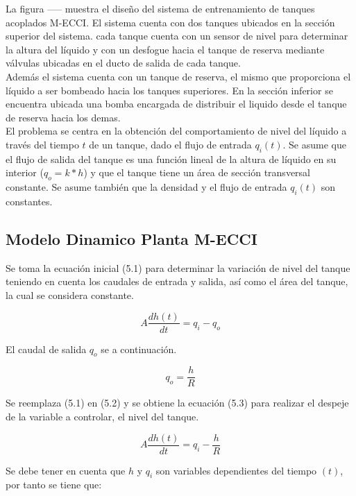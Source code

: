 \documentclass[a4paper,12pt,twoside]{proyectotanquesecci}
\begin{document}
La figura ----- muestra el diseño del sistema de entrenamiento de tanques acoplados M-ECCI. El sistema cuenta con dos tanques ubicados en la sección superior del sistema. cada tanque cuenta con un sensor de nivel para determinar la altura del líquido y con un desfogue hacia el tanque de reserva mediante válvulas
ubicadas en el ducto de salida de cada tanque. \\

Además el sistema cuenta con un tanque de reserva, el mismo que proporciona el líquido a ser bombeado hacia los tanques superiores. En la sección inferior se encuentra ubicada una bomba encargada de distribuir el liquido desde el tanque de reserva hacia los demas. \\

El problema se centra en la obtención del comportamiento de nivel del líquido a través del tiempo $t$ de un tanque, dado el flujo de entrada $q_{i}(t)$. Se asume que el flujo de salida del tanque es una función lineal de la altura de líquido en su interior ($q_{o}=k*h$) y que el tanque tiene un área de sección transversal constante. Se asume también que la densidad y el flujo de entrada $q_{i}(t)$ son constantes.

\subsection{Modelo Dinamico Planta M-ECCI}

Se toma la ecuación inicial (5.1) para determinar la variación de nivel del tanque teniendo en cuenta los caudales de entrada y salida, así como el área del tanque, la cual se considera constante.

\begin{equation}
A\frac {dh\left( t\right) }{dt}=q_{i}-q_{o}
\end{equation}

El caudal de salida $q_{o}$ se a continuación.

\begin{equation}
q_{o}=\frac{h}{R}
\end{equation}

Se reemplaza (5.1) en (5.2) y se obtiene la ecuación (5.3) para realizar el despeje de la variable a controlar, el nivel del tanque.

\begin{equation}
A\frac {dh\left( t\right) }{dt}=q_{i}-\frac {h}{R}
\end{equation}

Se debe tener en cuenta que $h$ y $q_{i}$ son variables dependientes del tiempo $(t)$, por tanto se tiene que:
\end{document}

